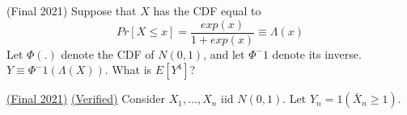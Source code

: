 \documentclass[answers]{exam}
\begin{document}
\begin{questions}
\question (Final 2021) Suppose that $X$ has the CDF equal to
$$Pr[X \leq x] = \frac{exp(x)}{1+exp(x)} \equiv \Lambda(x)$$
Let $\Phi(.)$ denote the CDF of $N(0,1)$, and let $\Phi^-1$ denote its inverse. $Y \equiv \Phi^-1(\Lambda(X))$. What is $E[Y^4]$?
\begin{solution}

\end{solution}

\question \href{https://drive.google.com/drive/folders/1f3rKaHYUMvUB4_RBHUFTtTVIzO9osoP4}{(Final 2021)} \href{https://drive.google.com/drive/folders/1f3rKaHYUMvUB4_RBHUFTtTVIzO9osoP4}{(Verified)} Consider $X_1,...,X_n$ iid $N(0,1)$. Let $Y_n = 1(\bar{X}_n\geq 1)$.


\end{questions}
\end{document}
